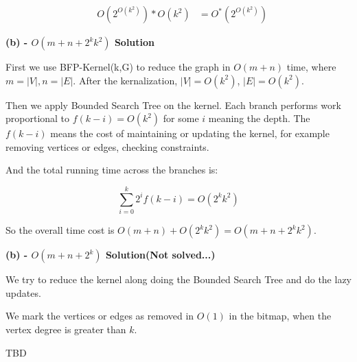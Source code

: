 \documentclass[12pt]{article}
\begin{document}
\begin{equation}
\begin{aligned}
&O(2^{O(k^2)}) * O(k^2)
&=O^*(2^{O(k^2)}) 
\end{aligned}
\end{equation}


\textbf{(b) - $O(m+n+2^k k^2)$ Solution}


First we use BFP-Kernel(k,G) to reduce the graph in $O(m+n)$ time, where $m=|V|, n=|E|$. After the kernalization, $|V|=O(k^2)$, $|E|=O(k^2)$.

Then we apply Bounded Search Tree on the kernel. Each branch performs work proportional to $f(k-i)=O(k^2)$ for some $i$ meaning the depth. The $f(k-i)$ means the cost of maintaining or updating the kernel, for example removing vertices or edges, checking constraints.

And the total running time across the branches is:

\begin{equation}
\sum_{i=0}^{k} 2^i f(k-i) = O(2^k k^2)
\end{equation}

So the overall time cost is $O(m+n)+O(2^k k^2) = O(m+n+2^k k^2)$.

\textbf{(b) - $O(m+n+2^k)$ Solution(Not solved...)}

We try to reduce the kernel along doing the Bounded Search Tree and do the lazy updates.

We mark the vertices or edges as removed in $O(1)$ in the bitmap, when the vertex degree is greater than $k$.

TBD
\end{document}
